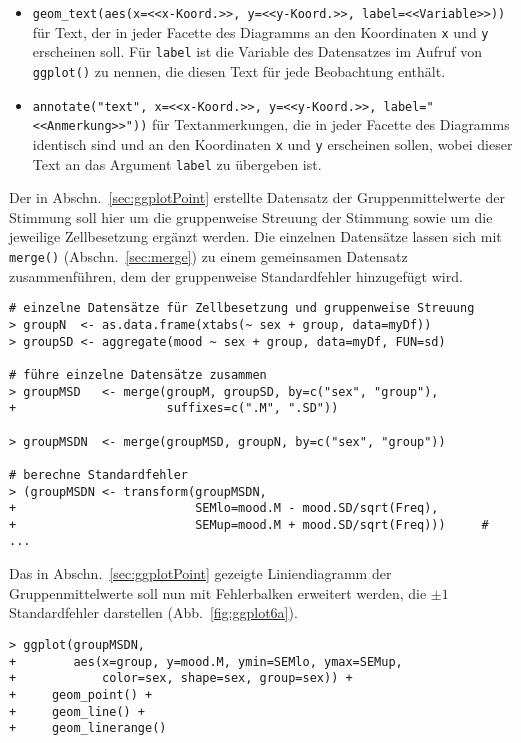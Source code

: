 \begin{itemize}
\item {} \lstinline!geom_text(aes(x=<<x-Koord.>>, y=<<y-Koord.>>, label=<<Variable>>))! für Text, der in jeder Facette des Diagramms an den Koordinaten \lstinline!x! und \lstinline!y! erscheinen soll. Für \lstinline!label! ist die Variable des Datensatzes im Aufruf von \lstinline!ggplot()! zu nennen, die diesen Text für jede Beobachtung enthält.
\item {} \lstinline!annotate("text", x=<<x-Koord.>>, y=<<y-Koord.>>, label="<<Anmerkung>>"))! für Textanmerkungen, die in jeder Facette des Diagramms identisch sind und an den Koordinaten \lstinline!x! und \lstinline!y! erscheinen sollen, wobei dieser Text an das Argument \lstinline!label! zu übergeben ist.
\end{itemize}

Der in Abschn.\ \ref{sec:ggplotPoint} erstellte Datensatz der Gruppenmittelwerte der Stimmung soll hier um die gruppenweise Streuung der Stimmung sowie um die jeweilige Zellbesetzung ergänzt werden. Die einzelnen Datensätze lassen sich mit \lstinline!merge()! (Abschn.\ \ref{sec:merge}) zu einem gemeinsamen Datensatz zusammenführen, dem der gruppenweise Standardfehler hinzugefügt wird.
\begin{lstlisting}
# einzelne Datensätze für Zellbesetzung und gruppenweise Streuung
> groupN  <- as.data.frame(xtabs(~ sex + group, data=myDf))
> groupSD <- aggregate(mood ~ sex + group, data=myDf, FUN=sd)

# führe einzelne Datensätze zusammen
> groupMSD   <- merge(groupM, groupSD, by=c("sex", "group"),
+                     suffixes=c(".M", ".SD"))

> groupMSDN  <- merge(groupMSD, groupN, by=c("sex", "group"))

# berechne Standardfehler
> (groupMSDN <- transform(groupMSDN,
+                         SEMlo=mood.M - mood.SD/sqrt(Freq),
+                         SEMup=mood.M + mood.SD/sqrt(Freq)))     # ...
\end{lstlisting}

Das in Abschn.\ \ref{sec:ggplotPoint} gezeigte Liniendiagramm der Gruppenmittelwerte soll nun mit Fehlerbalken erweitert werden, die $\pm 1$ Standardfehler darstellen (Abb.\ \ref{fig:ggplot6a}).
\begin{lstlisting}
> ggplot(groupMSDN,
+        aes(x=group, y=mood.M, ymin=SEMlo, ymax=SEMup,
+            color=sex, shape=sex, group=sex)) +
+     geom_point() +
+     geom_line() +
+     geom_linerange()
\end{lstlisting}

